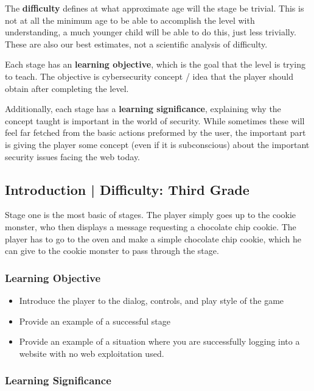 \documentclass{article}
\begin{document}
The \textbf{difficulty} defines at what approximate age will the stage
be trivial. This is not at all the minimum age to be able to accomplish
the level with understanding, a much younger child will be able to do
this, just less trivially. These are also our best estimates, not a
scientific analysis of difficulty.

Each stage has an \textbf{learning objective}, which is the goal that
the level is trying to teach. The objective is cybersecurity concept /
idea that the player should obtain after completing the level.

Additionally, each stage has a \textbf{learning significance},
explaining why the concept taught is important in the world of
security. While sometimes these will feel far fetched from the basic
actions preformed by the user, the important part is giving the player
some concept (even if it is subconscious) about the important security
issues facing the web today.

\subsection{Introduction | Difficulty: Third Grade}

Stage one is the most basic of stages. The player simply goes up to
the cookie monster, who then displays a message requesting a chocolate
chip cookie. The player has to go to the oven and make a simple
chocolate chip cookie, which he can give to the cookie monster to pass
through the stage.

\subsubsection{Learning Objective}

\begin{itemize}

  \item Introduce the player to the dialog, controls, and play style of
the game
  \item Provide an example of a successful stage
  \item Provide an example of a situation where you are successfully
logging into a website with no web exploitation used.
\end{itemize}

\subsubsection{Learning Significance}
\end{document}
